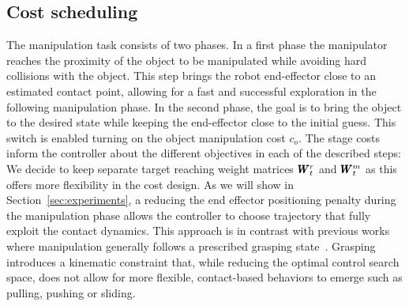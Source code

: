 \subsection{Cost scheduling}
The manipulation task consists of two phases. In a first phase the manipulator reaches the proximity of the object to be manipulated while avoiding hard collisions with the object. This step brings the robot end-effector close to an estimated contact point, allowing for a fast and successful exploration in the following manipulation phase. In the second phase, the goal is to bring the object to the desired state while keeping the end-effector close to the initial guess. This switch is enabled turning on the object manipulation cost $c_o$. The stage costs inform the controller about the different objectives in each of the described steps:
We decide to keep separate target reaching weight matrices $\pmb{W}_{t}^{r}$ and $\pmb{W}_{t}^{m}$ as this offers more flexibility in the cost design. As we will show in Section~\ref{sec:experiments}, a reducing the end effector positioning penalty during the manipulation phase allows the controller to choose trajectory that fully exploit the contact dynamics. This approach is in contrast with previous works where manipulation generally follows a prescribed grasping state~\cite{abraham_model-based_2020}. Grasping introduces a kinematic constraint that, while reducing the optimal control search space, does not allow for more flexible, contact-based behaviors to emerge such as pulling, pushing or sliding. 

